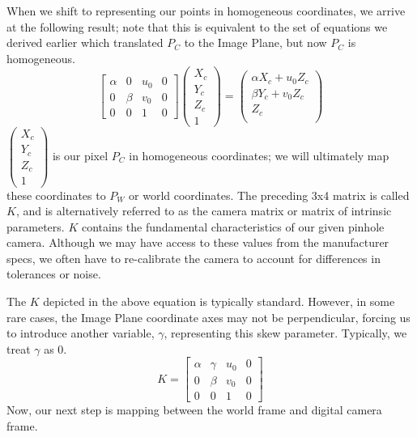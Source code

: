 \documentclass[]{article}
\begin{document}
When we shift to representing our points in homogeneous coordinates, we arrive at the following result; note that this is equivalent to the set of equations we derived earlier which translated $P_C$ to the Image Plane, but now $P_C$ is homogeneous.
\begin{equation}
\begin{bmatrix}
\alpha & 0 & u_{0} & 0 \\
0 & \beta & v_{0} & 0  \\
0 & 0 & 1 & 0
\end{bmatrix}
\begin{pmatrix}
X_{c} \\
Y_{c} \\
Z_{c} \\
1
\end{pmatrix}
=
\begin{pmatrix}
\alpha X_{c} + u_{0}Z_{c} \\
\beta Y_{c} + v_{0}Z_{c} \\
Z_{c} \\
\end{pmatrix}
\end{equation}
$\begin{pmatrix}
X_{c} \\
Y_{c} \\
Z_{c} \\
1
\end{pmatrix}
$
is our pixel $P_C$ in homogeneous coordinates; we will ultimately map these coordinates to $P_W$ or world coordinates.
The preceding 3x4 matrix is called $K$, and is alternatively referred to as the camera matrix or matrix of intrinsic parameters. $K$ contains the fundamental characteristics of our given pinhole camera. Although we may have access to these values from the manufacturer specs, we often have to re-calibrate the camera to account for differences in tolerances or noise.

The $K$ depicted in the above equation is typically standard. However, in some rare cases, the Image Plane coordinate axes may not be perpendicular, forcing us to introduce another variable, $\gamma$, representing this skew parameter. Typically, we treat $\gamma$ as 0.
\begin{equation}
K =
\begin{bmatrix}
\alpha & \gamma & u_{0} & 0 \\
0 & \beta & v_{0} & 0  \\
0 & 0 & 1 & 0
\end{bmatrix}
\end{equation}
Now, our next step is mapping between the world frame and digital camera frame.
\end{document}
